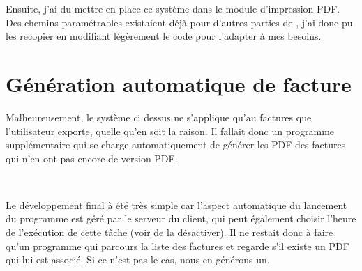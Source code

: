 Ensuite, j'ai du mettre en place ce système dans le module d'impression PDF. Des chemins paramétrables existaient déjà pour d'autres parties de \integrale, j'ai donc pu les recopier en modifiant légèrement le code pour l'adapter à mes besoins.

\section{Génération automatique de facture}
Malheureusement, le système ci dessus ne s'applique qu'au factures que l'utilisateur exporte, quelle qu'en soit la raison. Il fallait donc un programme supplémentaire qui se charge automatiquement de générer les PDF des factures qui n'en ont pas encore de version PDF.

~

Le développement final à été très simple car l'aspect automatique du lancement du programme est géré par le serveur du client, qui peut également choisir l'heure de l'exécution de cette tâche (voir de la désactiver). Il ne restait donc à faire qu'un programme qui parcours la liste des factures et regarde s'il existe un PDF qui lui est associé. Si ce n'est pas le cas, nous en générons un.
